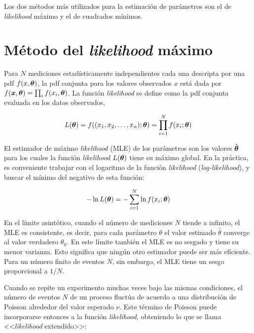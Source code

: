 Los dos métodos más utilizados para la estimación de parámetros son el de
\emph{likelihood} máximo y el de cuadrados mínimos.


\section{Método del \emph{likelihood} máximo}\label{sec:MLE}

Para $N$ mediciones estadísticamente independientes cada una descripta por una
pdf $f(x, \bm{\theta})$, la pdf conjunta para los valores observados $x$ está dada
por $f(\bm{x}, \bm{\theta}) = \prod_i f(x_i, \bm{\theta})$. La función \emph{likelihood}
se define como la pdf conjunta evaluada en los datos observados,

\begin{equation}
  L(\bm{\theta}) = f((x_1, x_2, \ldots, x_n); \bm{\theta}) = \prod_{i=1}^{N} f(x_i;
  \bm{\theta})
\end{equation}

El estimador de máximo \emph{likelihood} (MLE) de los parámetros {\btheta} son los
valores $\hat{\bm{\theta}}$ para los cuales la función \emph{likelihood} $L(\bm{\theta})$ tiene
su máximo global.
En la práctica, es conveniente trabajar con el logaritmo de la función
\emph{likelihood} (\emph{log-likelihood}), y buscar el mínimo del negativo de esta función:

\begin{equation}
  - \ln L(\bm{\theta}) = - \sum_{i=1}^{N} \ln f(x_i; \bm{\theta})
\end{equation}

En el límite asintótico, cuando el número de mediciones $N$ tiende a infinito,
el MLE es consistente, es decir, para cada parámetro $\theta$ el valor estimado
$\hat{\theta}$ converge al valor verdadero $\theta_0$. En este límite también el
MLE es no sesgado y tiene su menor varianza. Esto significa que ningún otro
estimador puede ser más eficiente. Para un número finito de eventos $N$, sin
embargo, el MLE tiene un sesgo proporcional a $1/N$.


Cuando se repite un experimento muchas veces bajo las mismas condiciones, el
número de eventos $N$ de un proceso fluctúa de acuerdo a una distribución
de Poisson alrededor del valor esperado $\nu$. Este término de Poisson puede
incorporarse entonces a la función \emph{likelihood}, obteniendo lo que se llama
<<\emph{likelihood} extendido>>:

